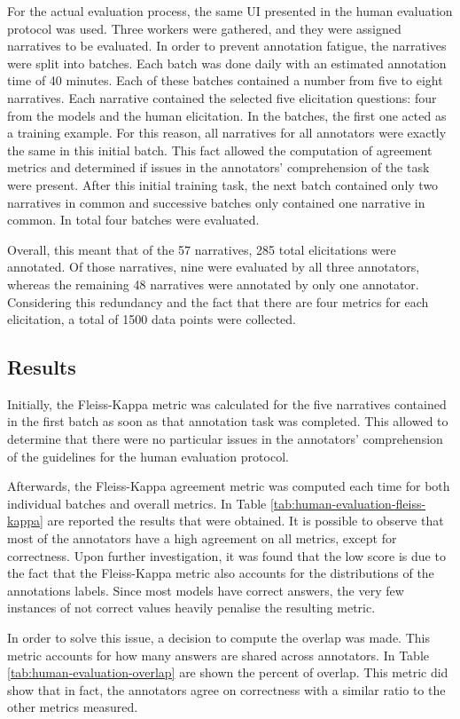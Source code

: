 For the actual evaluation process, the same UI presented in the human evaluation protocol was used. %
Three workers were gathered, and they were assigned narratives to be evaluated.  
In order to prevent annotation fatigue, the narratives were split into batches. Each batch was done daily with an estimated annotation time of 40 minutes. Each of these batches contained a number from five to eight narratives. Each narrative contained the selected five elicitation questions: four from the models and the human elicitation. In the batches, the first one acted as a training example. For this reason, all narratives for all annotators were exactly the same in this initial batch. This fact allowed the computation of agreement metrics and determined if issues in the annotators' comprehension of the task were present. After this initial training task, the next batch contained only two narratives in common and successive batches only contained one narrative in common. In total four batches were evaluated.

Overall, this meant that of the 57 narratives, 285 total elicitations were annotated. Of those narratives, nine were evaluated by all three annotators, whereas the remaining 48 narratives were annotated by only one annotator. Considering this redundancy and the fact that there are four metrics for each elicitation, a total of 1500 data points were collected.


\subsection{Results}
Initially, the Fleiss-Kappa \cite{fleiss} metric was calculated for the five narratives contained in the first batch as soon as that annotation task was completed. This allowed to determine that there were no particular issues in the annotators' comprehension of the guidelines for the human evaluation protocol.


Afterwards, the Fleiss-Kappa agreement metric was computed each time for both individual batches and overall metrics. In Table \ref{tab:human-evaluation-fleiss-kappa} are reported the results that were obtained. It is possible to observe that most of the annotators have a high agreement on all metrics, except for correctness. Upon further investigation, it was found that the low score is due to the fact that the Fleiss-Kappa metric also accounts for the distributions of the annotations labels. Since most models have correct answers, the very few instances of not correct values heavily penalise the resulting metric.

In order to solve this issue, a decision to compute the overlap was made. This metric accounts for how many answers are shared across annotators. In Table \ref{tab:human-evaluation-overlap} are shown the percent of overlap. This metric did show that in fact, the annotators agree on correctness with a similar ratio to the other metrics measured. 



